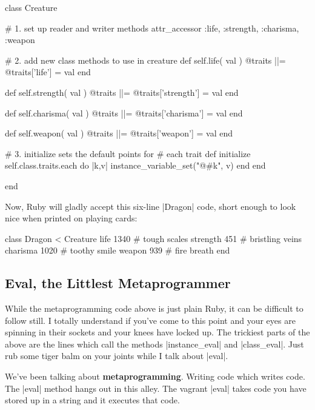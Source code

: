 \documentclass[12pt,twoside]{report}
\begin{document}
\begin{rubycode}

 class Creature

   # 1. set up reader and writer methods
   attr_accessor :life, :strength, :charisma, :weapon

   # 2. add new class methods to use in creature
   def self.life( val )
     @traits ||= {}
     @traits['life'] = val
   end

   def self.strength( val )
     @traits ||= {}
     @traits['strength'] = val
   end

   def self.charisma( val )
     @traits ||= {}
     @traits['charisma'] = val
   end

   def self.weapon( val )
     @traits ||= {}
     @traits['weapon'] = val
   end

   # 3. initialize sets the default points for
   #    each trait
   def initialize
     self.class.traits.each do |k,v|
       instance_variable_set("@#{k}", v)
     end
   end

 end

\end{rubycode}


Now, Ruby will gladly accept this six-line
\rubyinline|Dragon| code, short enough to look nice
when printed on playing cards:


\begin{rubycode}

 class Dragon < Creature
   life 1340     # tough scales
   strength 451  # bristling veins
   charisma 1020 # toothy smile
   weapon 939    # fire breath
 end

\end{rubycode}




\subsection{Eval, the Littlest Metaprogrammer}



While the metaprogramming code above is just plain Ruby, it can be
difficult to follow still. I totally understand if you've come to this
point and your eyes are spinning in their sockets and your knees have
locked up.  The trickiest parts of the above are the lines which call
the methods \rubyinline|instance_eval| and
\rubyinline|class_eval|.  Just rub some tiger balm on
your joints while I talk about \rubyinline|eval|.

We've been talking about {\bf metaprogramming}.  Writing code which
writes code.  The \rubyinline|eval| method hangs out
in this alley. The vagrant \rubyinline|eval| takes
code you have stored up in a string and it executes that code.
\end{document}
